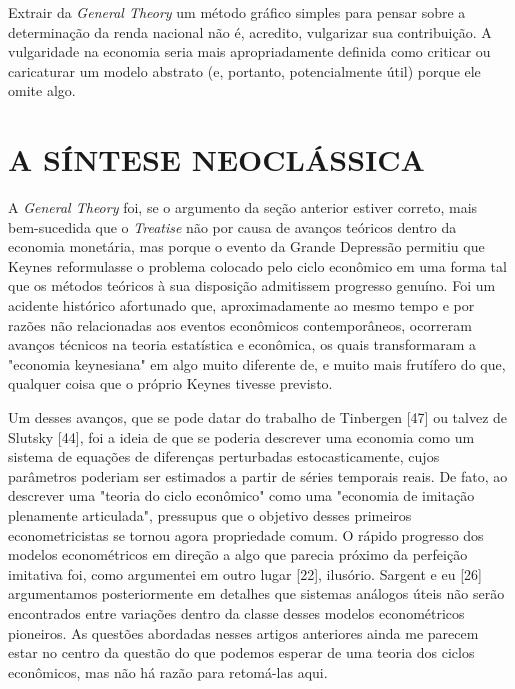 \documentclass[12pt]{article}
\begin{document}
Extrair da \textit{General Theory} um método gráfico simples para pensar sobre a determinação da renda nacional não é, acredito, vulgarizar sua contribuição. A vulgaridade na economia seria mais apropriadamente definida como criticar ou caricaturar um modelo abstrato (e, portanto, potencialmente útil) porque ele omite algo.

\section{A SÍNTESE NEOCLÁSSICA}

A \textit{General Theory} foi, se o argumento da seção anterior estiver correto, mais bem-sucedida que o \textit{Treatise} não por causa de avanços teóricos dentro da economia monetária, mas porque o evento da Grande Depressão permitiu que Keynes reformulasse o problema colocado pelo ciclo econômico em uma forma tal que os métodos teóricos à sua disposição admitissem progresso genuíno. Foi um acidente histórico afortunado que, aproximadamente ao mesmo tempo e por razões não relacionadas aos eventos econômicos contemporâneos, ocorreram avanços técnicos na teoria estatística e econômica, os quais transformaram a "economia keynesiana" em algo muito diferente de, e muito mais frutífero do que, qualquer coisa que o próprio Keynes tivesse previsto.

Um desses avanços, que se pode datar do trabalho de Tinbergen [47] ou talvez de Slutsky [44], foi a ideia de que se poderia descrever uma economia como um sistema de equações de diferenças perturbadas estocasticamente, cujos parâmetros poderiam ser estimados a partir de séries temporais reais. De fato, ao descrever uma "teoria do ciclo econômico" como uma "economia de imitação plenamente articulada", pressupus que o objetivo desses primeiros econometricistas se tornou agora propriedade comum. O rápido progresso dos modelos econométricos em direção a algo que parecia próximo da perfeição imitativa foi, como argumentei em outro lugar [22], ilusório. Sargent e eu [26] argumentamos posteriormente em detalhes que sistemas análogos úteis não serão encontrados entre variações dentro da classe desses modelos econométricos pioneiros. As questões abordadas nesses artigos anteriores ainda me parecem estar no centro da questão do que podemos esperar de uma teoria dos ciclos econômicos, mas não há razão para retomá-las aqui.
\end{document}
